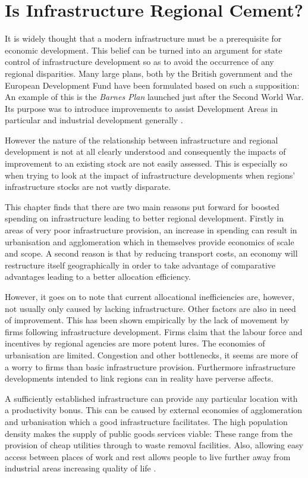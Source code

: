\chapter{Is Infrastructure Regional Cement?}

It is widely thought that a modern infrastructure must be a prerequisite for economic development. This belief can be turned into an argument for state control of infrastructure development so as to avoid the occurrence of any regional disparities. Many large plans, both by the British government and the European Development Fund have been formulated based on such a supposition: An example of this is the \textit{Barnes Plan} launched just after the Second World War. Its purpose was to introduce improvements to assist Development Areas in particular and industrial development generally \cite{Rodgers:1959}.

However the nature of the relationship between infrastructure and regional development is not at all clearly understood and consequently the impacts of improvement to an existing stock are not easily assessed. This is especially so when trying to look at the impact of infrastructure developments when regions' infrastructure stocks are not vastly disparate.

This chapter finds that there are two main reasons put forward for boosted spending on infrastructure leading to better regional development. Firstly in areas of very poor infrastructure provision, an increase in spending can result in urbanisation and agglomeration which in themselves provide economics of scale and scope. A second reason is that by reducing transport costs, an economy will restructure itself geographically in order to take advantage of comparative advantages leading to a better allocation efficiency.

However, it goes on to note that current allocational inefficiencies are, however, not usually only caused by lacking infrastructure. Other factors are also in need of improvement. This has been shown empirically by the lack of movement by firms following infrastructure development. Firms claim that the labour force and incentives by regional agencies are more potent lures. The economies of urbanisation are limited. Congestion and other bottlenecks, it seems are more of a worry to firms than basic infrastructure provision. Furthermore infrastructure developments intended to link regions can in reality have perverse affects.
 
A sufficiently established infrastructure can provide any particular location with a productivity bonus. This can be caused by external economies of agglomeration and urbanisation which a good infrastructure facilitates. The high population density makes the supply of public goods services viable: These range from the provision of cheap utilities through to waste removal facilities. Also, allowing easy access between places of work and rest allows people to live further away from industrial areas increasing quality of life \cite{Henderson:1988}.

